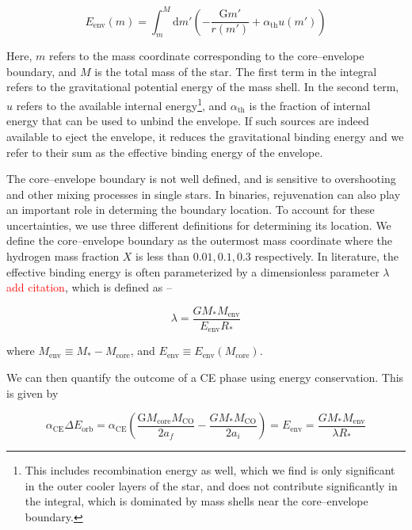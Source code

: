 \documentclass[linenumbers,trackchanges,twocolumn]{aastex701}
\newcommand{\red}{\textcolor{red}}
\begin{document}
\begin{equation}
    E_{\text{env}}(m) = \int_m^M \text{d}m' \left(-\frac{\text{G}m'}{r(m')} + \alpha_{\text{th}}u(m')\right) 
\end{equation}

Here, $m$ refers to the mass coordinate corresponding to the core--envelope boundary, and $M$ is the total mass of the star. The first term in the integral refers to the gravitational potential energy of the mass shell. In the second term, $u$ refers to the available internal energy\footnote{This includes recombination energy as well, which we find is only significant in the outer cooler layers of the star, and does not contribute significantly in the integral, which is dominated by mass shells near the core--envelope boundary.}, and $\alpha_{\text{th}}$ is the fraction of internal energy that can be used to unbind the envelope. If such sources are indeed available to eject the envelope, it reduces the gravitational binding energy and we refer to their sum as the effective binding energy of the envelope.

The core--envelope boundary is not well defined, and is sensitive to overshooting and other mixing processes in single stars. In binaries, rejuvenation can also play an important role in determing the boundary location. To account for these uncertainties, we use three different definitions for determining its location. We define the core--envelope boundary as the outermost mass coordinate where the hydrogen mass fraction $X$ is less than $0.01,0.1,0.3$ respectively. In literature, the effective binding energy is often parameterized by a dimensionless parameter $\lambda$ \red{add citation}, which is defined as --

\begin{equation}
    \lambda = \frac{GM_*M_{\text{env}}}{E_{\text{env}}R_{*}}
\end{equation}

where $M_{\text{env}} \equiv M_* - M_{\text{core}}$, and $E_{\text{env}} \equiv E_{\text{env}}(M_{\text{core}})$.

We can then quantify the outcome of a CE phase using energy conservation. This is given by

\begin{equation}
    \alpha_{\text{CE}} \Delta E_{\text{orb}} = \alpha_{\text{CE}} \left(\frac{\text{G}M_{\text{core}}M_{\text{CO}}}{2a_f} - \frac{GM_*M_{\text{CO}}}{2a_i}\right) = E_{\text{env}} = \frac{GM_*M_{\text{env}}}{\lambda R_{*}}
\end{equation}
\end{document}
